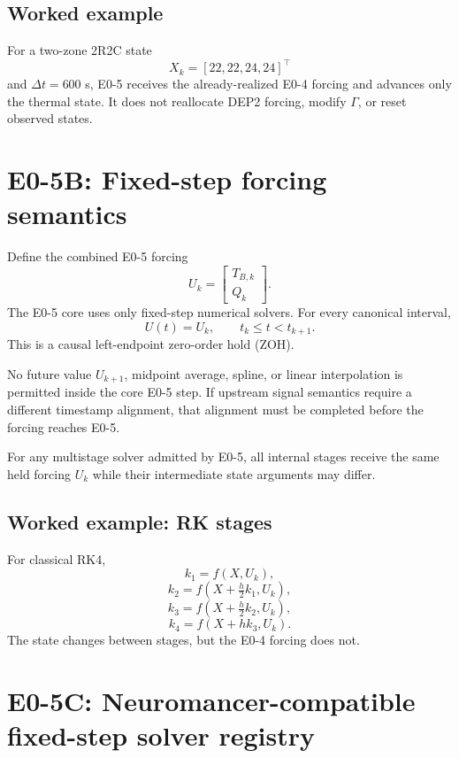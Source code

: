 \documentclass[11pt]{article}
\begin{document}
\subsection*{Worked example}
For a two-zone 2R2C state
\[
X_k=[22,22,24,24]^\top
\]
and $\Delta t=600$ s, E0-5 receives the already-realized E0-4 forcing and
advances only the thermal state. It does not reallocate DEP2 forcing, modify
$\Gamma$, or reset observed states.

\section{E0-5B: Fixed-step forcing semantics}

Define the combined E0-5 forcing
\[
\boxed{
U_k=\begin{bmatrix}T_{B,k}\\Q_k\end{bmatrix}.
}
\]
The E0-5 core uses only fixed-step numerical solvers. For every canonical
interval,
\[
\boxed{
U(t)=U_k,\qquad t_k\le t<t_{k+1}.
}
\]
This is a causal left-endpoint zero-order hold (ZOH).

No future value $U_{k+1}$, midpoint average, spline, or linear interpolation is
permitted inside the core E0-5 step. If upstream signal semantics require a
different timestamp alignment, that alignment must be completed before the
forcing reaches E0-5.

For any multistage solver admitted by E0-5, all internal stages receive the same
held forcing $U_k$ while their intermediate state arguments may differ.

\subsection*{Worked example: RK stages}
For classical RK4,
\[
k_1=f(X,U_k),
\]
\[
k_2=f(X+\tfrac{h}{2}k_1,U_k),
\]
\[
k_3=f(X+\tfrac{h}{2}k_2,U_k),
\]
\[
k_4=f(X+hk_3,U_k).
\]
The state changes between stages, but the E0-4 forcing does not.

\section{E0-5C: Neuromancer-compatible fixed-step solver registry}
\end{document}
